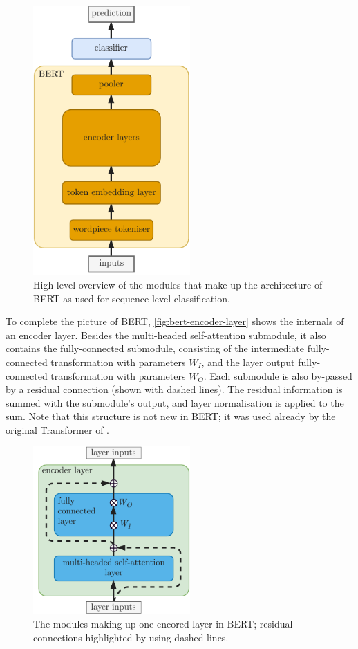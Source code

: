 \documentclass[bsc,frontabs,twoside,singlespacing,parskip,deptreport]{infthesis}
\begin{document}
{{{      \begin{figure}[h!t]
        \centering
        \includegraphics[width=6cm]{graphics/bert-hl}
        \caption{High-level overview of the modules that make up the architecture of BERT as used for sequence-level classification.}
        \label{fig:bert-hl}
      \end{figure}

      To complete the picture of BERT, \autoref{fig:bert-encoder-layer} shows the internals of an encoder layer. Besides the multi-headed self-attention submodule, it also contains the fully-connected submodule, consisting of the intermediate fully-connected transformation with parameters $W_I$, and the layer output fully-connected transformation with parameters $W_O$. Each submodule is also by-passed by a residual connection (shown with dashed lines). The residual information is summed with the submodule's output, and layer normalisation is applied to the sum. Note that this structure is not new in BERT; it was used already by the original Transformer of \citet{Vaswani_2017}.

      \begin{figure}[h!t]
        \centering
        \includegraphics[width=6cm]{graphics/bert-encoder-layer}
        \caption{The modules making up one encored layer in BERT; residual connections highlighted by using dashed lines.}
        \label{fig:bert-encoder-layer}
      \end{figure}
      
}}}
\end{document}
